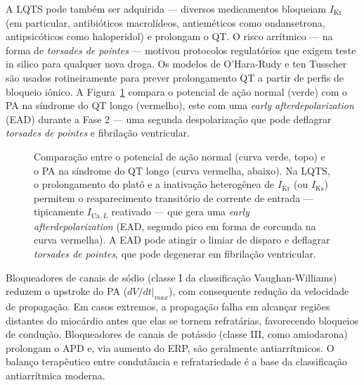 A LQTS pode também ser adquirida --- diversos medicamentos bloqueiam $I_{\mathrm{Kr}}$
(em particular, antibióticos macrolídeos, antieméticos como ondansetrona,
antipsicóticos como haloperidol) e prolongam o QT. O risco arrítmico --- na
forma de \emph{torsades de pointes} --- motivou protocolos regulatórios
que exigem teste in silico para qualquer nova droga. Os modelos de
O'Hara-Rudy e ten Tusscher são usados rotineiramente para prever
prolongamento QT a partir de perfis de bloqueio iônico. A
Figura~\ref{fig:12-lqts} compara o potencial de ação normal (verde)
com o PA na síndrome do QT longo (vermelho), este com uma
\emph{early afterdepolarization} (EAD) durante a Fase 2 --- uma
segunda despolarização que pode deflagrar \emph{torsades de
pointes} e fibrilação ventricular.

\begin{figure}[htbp]
\centering
{}
\caption{Comparação entre o potencial de ação normal (curva verde, topo) e o PA na síndrome do QT longo (curva vermelha, abaixo). Na LQTS, o prolongamento do platô e a inativação heterogênea de $I_{\mathrm{Kr}}$ (ou $I_{\mathrm{Ks}}$) permitem o reaparecimento transitório de corrente de entrada --- tipicamente $I_{\mathrm{Ca},L}$ reativado --- que gera uma \emph{early afterdepolarization} (EAD, segundo pico em forma de corcunda na curva vermelha). A EAD pode atingir o limiar de disparo e deflagrar \emph{torsades de pointes}, que pode degenerar em fibrilação ventricular.}
\label{fig:12-lqts}
\end{figure}

\begin{exemploenumv}
Bloqueadores de canais de sódio (classe I da classificação Vaughan-Williams)
reduzem o upstroke do PA ($dV/dt|_{max}$), com consequente redução da
velocidade de propagação. Em casos extremos, a propagação falha em
alcançar regiões distantes do miocárdio antes que elas se tornem
refratárias, favorecendo bloqueios de condução. Bloqueadores de canais
de potássio (classe III, como amiodarona) prolongam o APD e, via
aumento do ERP, são geralmente antiarrítmicos. O balanço terapêutico
entre condutância e refratariedade é a base da classificação
antiarrítmica moderna.
\end{exemploenumv}

